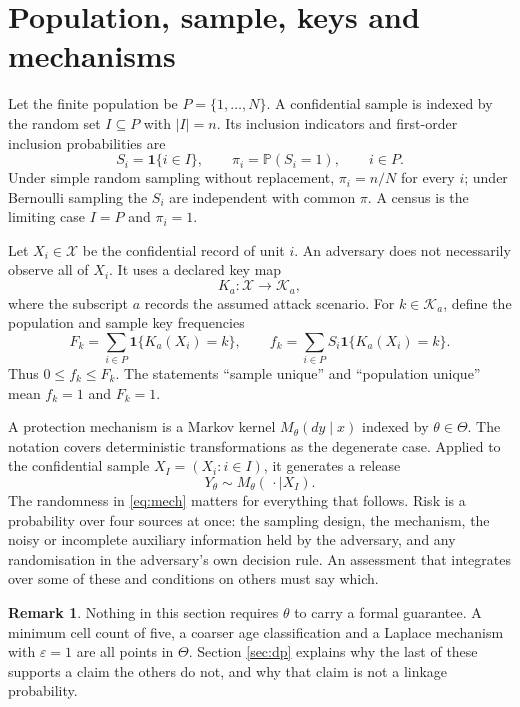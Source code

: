 \documentclass[11pt,a4paper]{article}
\theoremstyle{plain}
\theoremstyle{definition}
\newtheorem{remark}{Remark}
\newcommand{\Prob}{\mathbb{P}}
\newcommand{\ind}[1]{\mathbf{1}\{#1\}}
\begin{document}
\section{Population, sample, keys and mechanisms}\label{sec:setup}

Let the finite population be $P = \{1, \dots, N\}$. A confidential sample is
indexed by the random set $I \subseteq P$ with $|I| = n$. Its inclusion
indicators and first-order inclusion probabilities are
\begin{equation}
S_i = \ind{i \in I}, \qquad \pi_i = \Prob(S_i = 1), \qquad i \in P .
\end{equation}
Under simple random sampling without replacement, $\pi_i = n/N$ for every $i$;
under Bernoulli sampling the $S_i$ are independent with common $\pi$. A census
is the limiting case $I = P$ and $\pi_i = 1$.

Let $X_i \in \mathcal{X}$ be the confidential record of unit $i$. An adversary
does not necessarily observe all of $X_i$. It uses a declared key map
\begin{equation}
K_a : \mathcal{X} \longrightarrow \mathcal{K}_a ,
\end{equation}
where the subscript $a$ records the assumed attack scenario. For $k \in
\mathcal{K}_a$, define the population and sample key frequencies
\begin{equation}
F_k = \sum_{i \in P} \ind{K_a(X_i) = k}, \qquad
f_k = \sum_{i \in P} S_i \ind{K_a(X_i) = k} .
\label{eq:freq}
\end{equation}
Thus $0 \leq f_k \leq F_k$. The statements ``sample unique'' and ``population
unique'' mean $f_k = 1$ and $F_k = 1$.

A protection mechanism is a Markov kernel $M_\theta(dy \mid x)$ indexed by
$\theta \in \Theta$. The notation covers deterministic transformations as the
degenerate case. Applied to the confidential sample $X_I = (X_i : i \in I)$, it
generates a release
\begin{equation}
Y_\theta \sim M_\theta(\,\cdot \mid X_I) .
\label{eq:mech}
\end{equation}
The randomness in \eqref{eq:mech} matters for everything that follows. Risk is
a probability over four sources at once: the sampling design, the mechanism, the
noisy or incomplete auxiliary information held by the adversary, and any
randomisation in the adversary's own decision rule. An assessment that
integrates over some of these and conditions on others must say which.

\begin{remark}
Nothing in this section requires $\theta$ to carry a formal guarantee. A
minimum cell count of five, a coarser age classification and a Laplace mechanism
with $\varepsilon = 1$ are all points in $\Theta$. Section \ref{sec:dp} explains
why the last of these supports a claim the others do not, and why that claim is
not a linkage probability.
\end{remark}
\end{document}
